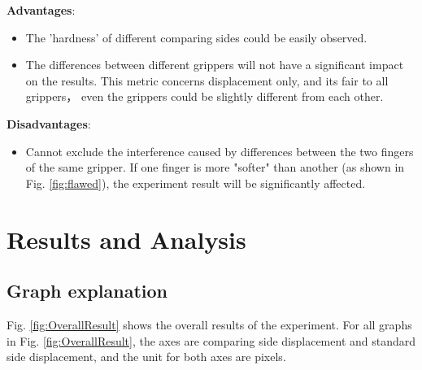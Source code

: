 \documentclass[conference]{IEEEtran}
\begin{document}
 \textbf{Advantages}:
 \begin{itemize}
     \item The 'hardness' of different comparing sides could be easily observed. 
     \item The differences between different grippers will not have a significant impact on the results. This metric concerns displacement only, and its fair to all grippers， even the grippers could be slightly different from each other.
 \end{itemize}
 
 \textbf{Disadvantages}:
  \begin{itemize}
     \item Cannot exclude the interference caused by differences between the two fingers of the same gripper. If one finger is more "softer" than another (as shown in Fig. \ref{fig:flawed}), the experiment result will be significantly affected.
 \end{itemize}




\section{Results and Analysis}

\label{results}

\subsection{Graph explanation}


Fig. \ref{fig:OverallResult} shows the overall results of the experiment. For all graphs in Fig. \ref{fig:OverallResult}, the axes are comparing side displacement and standard side displacement, and the unit for both axes are pixels.
\end{document}
